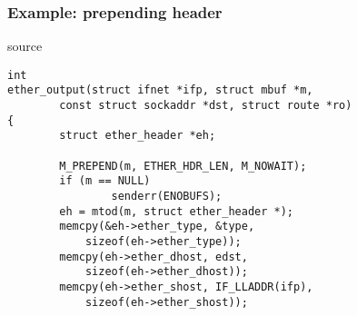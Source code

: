 \documentclass{beamer}
\begin{document}
\begin{frame}[fragile]
\frametitle{Example: prepending header}
\begin{beamercolorbox}[rounded=true,shadow=true]{source}
\lstset{language=C}
\scriptsize\begin{lstlisting}
int
ether_output(struct ifnet *ifp, struct mbuf *m,
        const struct sockaddr *dst, struct route *ro)
{
        struct ether_header *eh;

        M_PREPEND(m, ETHER_HDR_LEN, M_NOWAIT);
        if (m == NULL)
                senderr(ENOBUFS);
        eh = mtod(m, struct ether_header *);
        memcpy(&eh->ether_type, &type,
            sizeof(eh->ether_type));
        memcpy(eh->ether_dhost, edst,
            sizeof(eh->ether_dhost));
        memcpy(eh->ether_shost, IF_LLADDR(ifp),
            sizeof(eh->ether_shost));
\end{lstlisting}
\end{beamercolorbox}
\end{frame}
\end{document}
